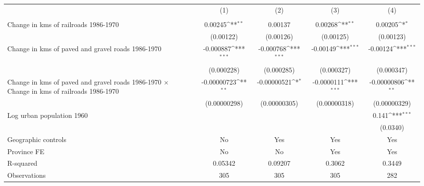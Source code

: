 {
\def\sym#1{\ifmmode^{#1}\else\(^{#1}\)\fi}
\begin{tabular}{l*{4}{c}}
\hline\hline
                &\multicolumn{1}{c}{(1)}&\multicolumn{1}{c}{(2)}&\multicolumn{1}{c}{(3)}&\multicolumn{1}{c}{(4)}\\
                &\multicolumn{1}{c}{}&\multicolumn{1}{c}{}&\multicolumn{1}{c}{}&\multicolumn{1}{c}{}\\
\hline
Change in kms of railroads 1986-1970&  0.00245\sym{**} &  0.00137         &  0.00268\sym{**} &  0.00205\sym{*}  \\
                &(0.00122)         &(0.00126)         &(0.00125)         &(0.00123)         \\
[1em]
Change in kms of paved and gravel roads 1986-1970&-0.000887\sym{***}&-0.000768\sym{***}& -0.00149\sym{***}& -0.00124\sym{***}\\
                &(0.000228)         &(0.000285)         &(0.000327)         &(0.000347)         \\
[1em]
Change in kms of paved and gravel roads 1986-1970 $\times$ Change in kms of railroads 1986-1970&-0.00000723\sym{**} &-0.00000521\sym{*}  &-0.0000111\sym{***}&-0.00000806\sym{**} \\
                &(0.00000298)         &(0.00000305)         &(0.00000318)         &(0.00000329)         \\
[1em]
Log urban population 1960&                  &                  &                  &    0.141\sym{***}\\
                &                  &                  &                  & (0.0340)         \\
\hline
Geographic controls&       No         &      Yes         &      Yes         &      Yes         \\
Province FE     &       No         &       No         &      Yes         &      Yes         \\
R-squared       &  0.05342         &  0.09207         &   0.3062         &   0.3449         \\
Observations    &      305         &      305         &      305         &      282         \\
\hline\hline
\end{tabular}
}
